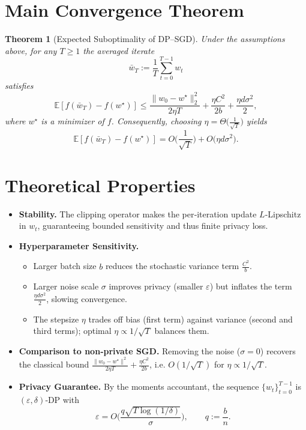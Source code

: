 \documentclass{article}
\newtheorem{theorem}{Theorem}
\newcommand{\E}{\mathbb{E}}
\begin{document}
\section*{Main Convergence Theorem}
\begin{theorem}[Expected Suboptimality of DP--SGD]\label{thm:main}
Under the assumptions above, for any $T\ge1$ the averaged iterate
\[
\bar w_T:=\frac{1}{T}\sum_{t=0}^{T-1} w_t
\]
satisfies
\[
\E\!\left[f(\bar w_T)-f(w^\star)\right]\le
\frac{\|w_0-w^\star\|_2^2}{2\eta T}
+\frac{\eta C^2}{2b}
+\frac{\eta d\sigma^2}{2},
\]
where $w^\star$ is a minimizer of $f$.
Consequently, choosing $\eta = \Theta\!\big(\tfrac{1}{\sqrt{T}}\big)$ yields
\[
\E\!\left[f(\bar w_T)-f(w^\star)\right]=O\!\Big(\frac{1}{\sqrt{T}}\Big)
+O\!\big(\eta d\sigma^2\big).
\]
\end{theorem}

\section*{Theoretical Properties}
\begin{itemize}
\item \textbf{Stability.} The clipping operator makes the per‑iteration update $L$‑Lipschitz in $w_t$, guaranteeing bounded sensitivity and thus finite privacy loss.
\item \textbf{Hyperparameter Sensitivity.}
    \begin{itemize}
    \item Larger batch size $b$ reduces the stochastic variance term $\frac{C^2}{b}$.
    \item Larger noise scale $\sigma$ improves privacy (smaller $\varepsilon$) but inflates the term $\frac{\eta d\sigma^2}{2}$, slowing convergence.
    \item The stepsize $\eta$ trades off bias (first term) against variance (second and third terms); optimal $\eta\propto 1/\sqrt{T}$ balances them.
    \end{itemize}
\item \textbf{Comparison to non‑private SGD.} Removing the noise ($\sigma=0$) recovers the classical bound $\frac{\|w_0-w^\star\|^2}{2\eta T}+ \frac{\eta C^2}{2b}$, i.e. $O(1/\sqrt{T})$ for $\eta\propto 1/\sqrt{T}$.
\item \textbf{Privacy Guarantee.} By the moments accountant, the sequence $\{w_t\}_{t=0}^{T-1}$ is $(\varepsilon,\delta)$‑DP with
\[
\varepsilon = O\!\Big(\frac{q\sqrt{T\log(1/\delta)}}{\sigma}\Big),
\qquad q:=\frac{b}{n}.
\]
\end{itemize}
\end{document}
